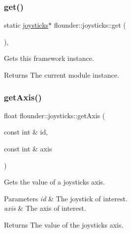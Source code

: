 \subsubsection{\texorpdfstring{get()}{get()}}
{\footnotesize\ttfamily static \hyperlink{classflounder_1_1joysticks}{joysticks}$\ast$ flounder\+::joysticks\+::get (\begin{DoxyParamCaption}{ }\end{DoxyParamCaption})\hspace{0.3cm}{\ttfamily [inline]}, {\ttfamily [static]}}



Gets this framework instance. 

\begin{DoxyReturn}{Returns}
The current module instance. 
\end{DoxyReturn}
\mbox{\label{classflounder_1_1joysticks_a67c5fd2f77004c37cf1720c985c9d6f9}} 
\subsubsection{\texorpdfstring{get\+Axis()}{getAxis()}}
{\footnotesize\ttfamily float flounder\+::joysticks\+::get\+Axis (\begin{DoxyParamCaption}\item[{const int \&}]{id,  }\item[{const int \&}]{axis }\end{DoxyParamCaption})}



Gets the value of a joysticks axis. 


\begin{DoxyParams}{Parameters}
{\em id} & The joystick of interest. \\
\hline
{\em axis} & The axis of interest. \\
\hline
\end{DoxyParams}
\begin{DoxyReturn}{Returns}
The value of the joystick\textquotesingle{}s axis. 
\end{DoxyReturn}
\mbox{\label{classflounder_1_1joysticks_a908373adb0a8ca4818b7d49b273d4622}} 
